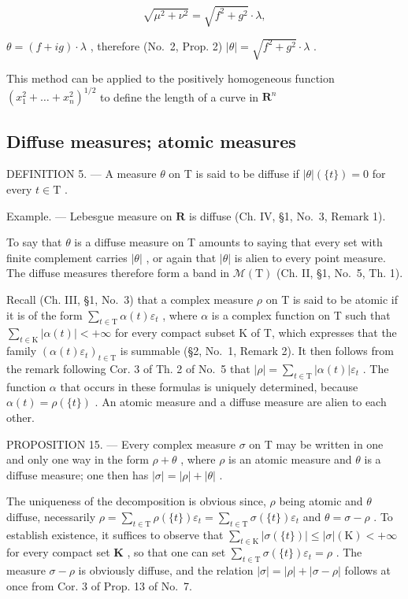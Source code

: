 \[
\sqrt {\mu^ {2} + \nu^ {2}} = \sqrt {f ^ {2} + g ^ {2}} \cdot \lambda ,
\]

\(\theta = (f + ig) \cdot \lambda\) , therefore (No.~2, Prop. 2) \(|\theta| = \sqrt{f^2 + g^2} \cdot \lambda\) .

This method can be applied to the positively homogeneous function \((x_1^2 +\ldots +x_n^2)^{1 / 2}\) to define the length of a curve in \(\mathbf{R}^n\)

\subsection{Diffuse measures; atomic measures}

DEFINITION 5. --- A measure \(\theta\) on T is said to be diffuse if \(|\theta|(\{t\}) = 0\) for every \(t \in \mathrm{T}\) .

Example. --- Lebesgue measure on \(\mathbf{R}\) is diffuse (Ch. IV, §1, No.~3, Remark 1).

To say that \(\theta\) is a diffuse measure on T amounts to saying that every set with finite complement carries \(|\theta|\) , or again that \(|\theta|\) is alien to every point measure. The diffuse measures therefore form a band in \(\mathcal{M}(\mathrm{T})\) (Ch. II, §1, No.~5, Th. 1).

Recall (Ch. III, §1, No.~3) that a complex measure \(\rho\) on T is said to be atomic if it is of the form \(\sum_{t\in \mathrm{T}}\alpha (t)\varepsilon_t\) , where \(\alpha\) is a complex function on T such that \(\sum_{t\in \mathrm{K}}|\alpha (t)| < +\infty\) for every compact subset K of T, which expresses that the family \(\left(\alpha (t)\varepsilon_t\right)_{t\in \mathrm{T}}\) is summable (§2, No.~1, Remark 2). It then follows from the remark following Cor. 3 of Th. 2 of No.~5 that \(|\rho| = \sum_{t\in \mathrm{T}}|\alpha (t)|\varepsilon_t\) . The function \(\alpha\) that occurs in these formulas is uniquely determined, because \(\alpha (t) = \rho (\{t\})\) . An atomic measure and a diffuse measure are alien to each other.

PROPOSITION 15. --- Every complex measure \(\sigma\) on T may be written in one and only one way in the form \(\rho + \theta\) , where \(\rho\) is an atomic measure and \(\theta\) is a diffuse measure; one then has \(|\sigma| = |\rho| + |\theta|\) .

The uniqueness of the decomposition is obvious since, \(\rho\) being atomic and \(\theta\) diffuse, necessarily \(\rho = \sum_{t\in \mathrm{T}}\rho (\{t\})\varepsilon_t = \sum_{t\in \mathrm{T}}\sigma (\{t\})\varepsilon_t\) and \(\theta = \sigma -\rho\) . To establish existence, it suffices to observe that \(\sum_{t\in \mathrm{K}}|\sigma (\{t\})| \leqslant |\sigma |(\mathrm{K}) < +\infty\) for every compact set \(\mathbf{K}\) , so that one can set \(\sum_{t\in \mathrm{T}}\sigma (\{t\})\varepsilon_t = \rho\) . The measure \(\sigma -\rho\) is obviously diffuse, and the relation \(|\sigma | = |\rho | + |\sigma -\rho |\) follows at once from Cor. 3 of Prop. 13 of No.~7.

